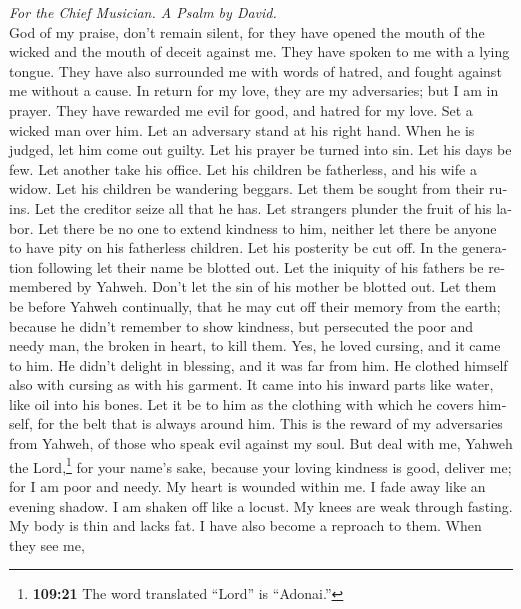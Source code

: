 \begin{paracol}{2}
\begin{otherlanguage}{english}
\emph{For the Chief Musician. A Psalm by David.}\\
 God of my praise, don't remain silent,  for
they have opened the mouth of the wicked and the mouth of deceit against
me. They have spoken to me with a lying tongue.  They have
also surrounded me with words of hatred, and fought against me without a
cause.  In return for my love, they are my adversaries;
but I am in prayer.  They have rewarded me evil for good,
and hatred for my love.  Set a wicked man over him. Let an
adversary stand at his right hand.  When he is judged, let
him come out guilty. Let his prayer be turned into sin. 
Let his days be few. Let another take his office.  Let his
children be fatherless, and his wife a widow.  Let his
children be wandering beggars. Let them be sought from their ruins.
 Let the creditor seize all that he has. Let strangers
plunder the fruit of his labor.  Let there be no one to
extend kindness to him, neither let there be anyone to have pity on his
fatherless children.  Let his posterity be cut off. In
the generation following let their name be blotted out. 
Let the iniquity of his fathers be remembered by Yahweh. Don't let the
sin of his mother be blotted out.  Let them be before
Yahweh continually, that he may cut off their memory from the earth;
 because he didn't remember to show kindness, but
persecuted the poor and needy man, the broken in heart, to kill them.
 Yes, he loved cursing, and it came to him. He didn't
delight in blessing, and it was far from him.  He clothed
himself also with cursing as with his garment. It came into his inward
parts like water, like oil into his bones.  Let it be to
him as the clothing with which he covers himself, for the belt that is
always around him.  This is the reward of my adversaries
from Yahweh, of those who speak evil against my soul. 
But deal with me, Yahweh the Lord,\footnote{\textbf{109:21} The word
  translated ``Lord'' is ``Adonai.''} for your name's sake, because your
loving kindness is good, deliver me;  for I am poor and
needy. My heart is wounded within me.  I fade away like
an evening shadow. I am shaken off like a locust.  My
knees are weak through fasting. My body is thin and lacks fat.
 I have also become a reproach to them. When they see me,

\end{otherlanguage}
\end{paracol}

